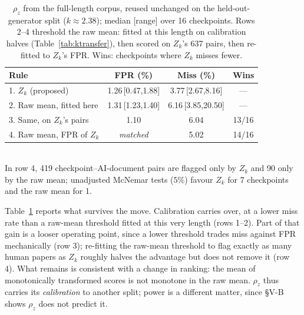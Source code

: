 \documentclass[10pt,conference,a4paper]{IEEEtran}
\newcommand{\sect}[1]{\S#1}
\begin{document}
\begin{table}[t]
\caption{$\rho_z$ from the full-length corpus, reused unchanged on the
held-out-generator split ($k{\approx}2.38$); median [range] over 16 checkpoints.
Rows 2--4 threshold the raw mean: fitted at this length on calibration halves
(Table~\ref{tab:ktransfer}), then scored on $Z_k$'s 637 pairs, then re-fitted to
$Z_k$'s FPR. Wins: checkpoints where $Z_k$ misses fewer.}
\label{tab:ood}
\centering
\scriptsize
\setlength{\tabcolsep}{3pt}
\begin{tabular}{@{}lccc@{}}
\toprule
Rule & FPR (\%) & Miss (\%) & Wins \\
\midrule
1. $Z_k$ (proposed) & 1.26\,[0.47,1.88] & 3.77\,[2.67,8.16] & --- \\
\midrule
2. Raw mean, fitted here & 1.31\,[1.23,1.40] & 6.16\,[3.85,20.50] & --- \\
3. Same, on $Z_k$'s pairs & 1.10 & 6.04 & 13/16 \\
4. Raw mean, FPR of $Z_k$ & \emph{matched} & 5.02 & 14/16 \\
\bottomrule
\end{tabular}
\\[2pt]\footnotesize In row 4, 419 checkpoint--AI-document pairs are flagged only
by $Z_k$ and 90 only by the raw mean; unadjusted McNemar tests ($5\%$) favour
$Z_k$ for 7 checkpoints and the raw mean for 1.
\end{table}

Table~\ref{tab:ood} reports what survives the move. Calibration carries over, at a lower
miss rate than a raw-mean threshold fitted at this very length (rows 1--2). Part of
that gain is a looser operating point, since a lower threshold trades miss against FPR
mechanically (row 3); re-fitting the raw-mean threshold to flag exactly as many human
papers as $Z_k$ roughly halves the advantage but does not remove it (row 4). What
remains is consistent with a change in ranking: the mean of monotonically transformed
scores is not monotone in the raw mean. $\rho_z$ thus carries its \emph{calibration}
to another split; power is a different matter, since \sect{V-B} shows $\rho_z$ does not
predict it.
\end{document}
